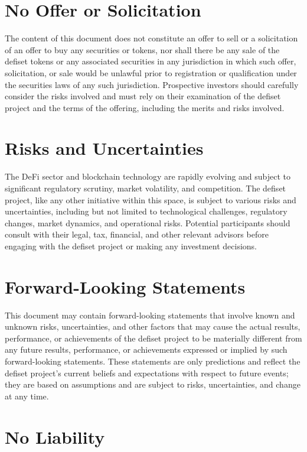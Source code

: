 \documentclass[11pt,oneside,a4paper]{article}
\begin{document}
\section{No Offer or Solicitation}

The content of this document does not constitute an offer to sell or a solicitation of an offer to buy any securities or tokens, nor shall there be any sale of the defiset tokens or any associated securities in any jurisdiction in which such offer, solicitation, or sale would be unlawful prior to registration or qualification under the securities laws of any such jurisdiction. Prospective investors should carefully consider the risks involved and must rely on their examination of the defiset project and the terms of the offering, including the merits and risks involved.

\section{Risks and Uncertainties}

The DeFi sector and blockchain technology are rapidly evolving and subject to significant regulatory scrutiny, market volatility, and competition. The defiset project, like any other initiative within this space, is subject to various risks and uncertainties, including but not limited to technological challenges, regulatory changes, market dynamics, and operational risks. Potential participants should consult with their legal, tax, financial, and other relevant advisors before engaging with the defiset project or making any investment decisions.


\section{Forward-Looking Statements}

This document may contain forward-looking statements that involve known and unknown risks, uncertainties, and other factors that may cause the actual results, performance, or achievements of the defiset project to be materially different from any future results, performance, or achievements expressed or implied by such forward-looking statements. These statements are only predictions and reflect the defiset project's current beliefs and expectations with respect to future events; they are based on assumptions and are subject to risks, uncertainties, and change at any time.

\section{No Liability}
\end{document}
